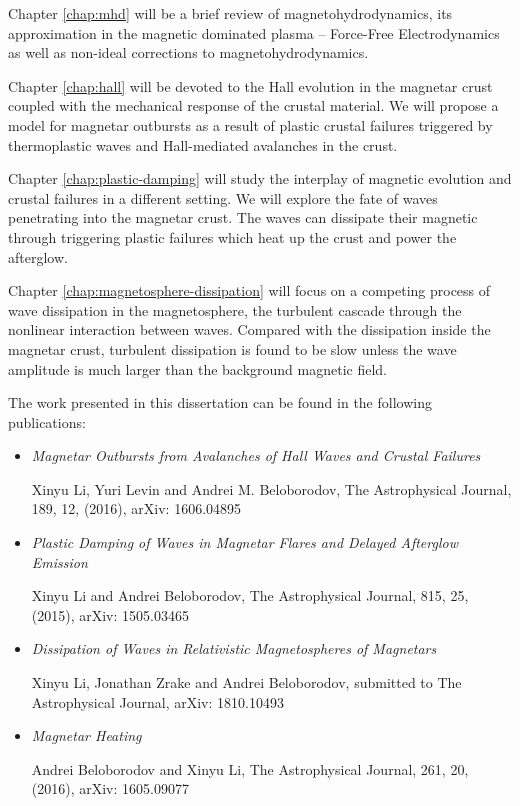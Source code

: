 Chapter \ref{chap:mhd} will be a brief review of magnetohydrodynamics, its approximation in the magnetic dominated plasma -- Force-Free Electrodynamics as well as non-ideal corrections to magnetohydrodynamics.

Chapter \ref{chap:hall} will be devoted to the Hall evolution in the magnetar crust coupled with the mechanical response of the crustal material. We will propose a model for magnetar outbursts as a result of plastic crustal failures triggered by thermoplastic waves and Hall-mediated avalanches in the crust.

Chapter \ref{chap:plastic-damping} will study the interplay of magnetic evolution and crustal failures in a different setting. We will explore the fate of \alfven waves penetrating into the magnetar crust. The \alfven waves can dissipate their magnetic through triggering plastic failures which heat up the crust and power the afterglow.

Chapter \ref{chap:magnetosphere-dissipation} will focus on a competing process of \alfven wave dissipation in the magnetosphere, the turbulent cascade through the nonlinear interaction between waves. Compared with the dissipation inside the magnetar crust, turbulent dissipation is found to be slow unless the wave amplitude is much larger than the background magnetic field.

The work presented in this dissertation can be found in the following publications:
\begin{itemize}
	
\item \textit{Magnetar Outbursts from Avalanches of Hall Waves and Crustal Failures} 

Xinyu Li,  Yuri Levin and Andrei M. Beloborodov, The Astrophysical Journal, 189, 12, (2016), arXiv: 1606.04895

\item \textit{Plastic Damping of \alfven Waves in Magnetar Flares and Delayed Afterglow Emission}
 
Xinyu Li and Andrei Beloborodov, The Astrophysical Journal, 815, 25, (2015), arXiv: 1505.03465

\item \textit{Dissipation of \alfven Waves in Relativistic Magnetospheres of Magnetars}
 
Xinyu Li, Jonathan Zrake and Andrei Beloborodov, submitted to The Astrophysical Journal, arXiv: 1810.10493

\item \textit{Magnetar Heating}

Andrei Beloborodov and Xinyu Li, The Astrophysical Journal, 261, 20, (2016), arXiv: 1605.09077

\end{itemize}





